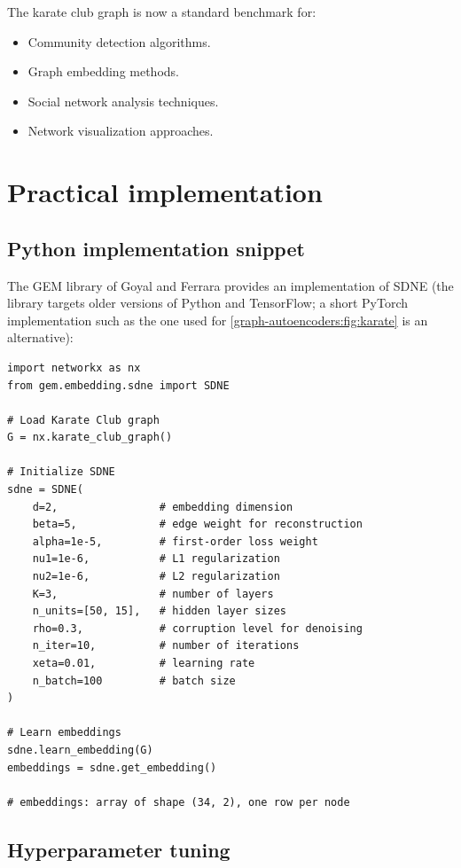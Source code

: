 \begin{notechapter}
The karate club graph is now a standard benchmark for:
\begin{itemize}
    \item Community detection algorithms.
    \item Graph embedding methods.
    \item Social network analysis techniques.
    \item Network visualization approaches.
\end{itemize}

\section{Practical implementation}

\subsection{Python implementation snippet}

The GEM library of Goyal and Ferrara provides an implementation of SDNE (the library targets older versions of Python and TensorFlow; a short PyTorch implementation such as the one used for \cref{graph-autoencoders:fig:karate} is an alternative):

\begin{verbatim}
import networkx as nx
from gem.embedding.sdne import SDNE

# Load Karate Club graph
G = nx.karate_club_graph()

# Initialize SDNE
sdne = SDNE(
    d=2,                # embedding dimension
    beta=5,             # edge weight for reconstruction
    alpha=1e-5,         # first-order loss weight
    nu1=1e-6,           # L1 regularization
    nu2=1e-6,           # L2 regularization
    K=3,                # number of layers
    n_units=[50, 15],   # hidden layer sizes
    rho=0.3,            # corruption level for denoising
    n_iter=10,          # number of iterations
    xeta=0.01,          # learning rate
    n_batch=100         # batch size
)

# Learn embeddings
sdne.learn_embedding(G)
embeddings = sdne.get_embedding()

# embeddings: array of shape (34, 2), one row per node
\end{verbatim}

\subsection{Hyperparameter tuning}


\end{notechapter}
